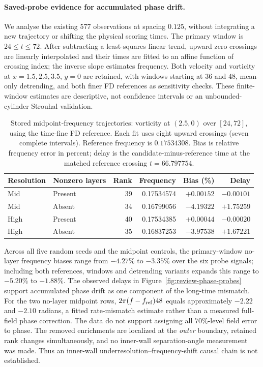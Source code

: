 \paragraph{Saved-probe evidence for accumulated phase drift.}
We analyse the existing 577 observations at spacing $0.125$, without integrating a new trajectory or shifting the physical scoring times. The primary window is $24\leq t\leq72$. After subtracting a least-squares linear trend, upward zero crossings are linearly interpolated and their times are fitted to an affine function of crossing index; the inverse slope estimates frequency. Both velocity and vorticity at $x=1.5,2.5,3.5$, $y=0$ are retained, with windows starting at 36 and 48, mean-only detrending, and both finer FD references as sensitivity checks. These finite-window estimates are descriptive, not confidence intervals or an unbounded-cylinder Strouhal validation.

\begin{table}[htbp]
\centering\small
\caption{Stored midpoint-frequency trajectories: vorticity at $(2.5,0)$ over $[24,72]$, using the time-fine FD reference. Each fit uses eight upward crossings (seven complete intervals). Reference frequency is $0.17534308$. Bias is relative frequency error in percent; delay is the candidate-minus-reference time at the matched reference crossing $t=66.797754$.}
\label{tab:review-phase-probes}
\begin{tabular}{llrrrr}
\toprule
Resolution & Nonzero layers & Rank & Frequency & Bias (\%) & Delay\\
\midrule
Mid & Present & 39 & 0.17534574 & $+0.00152$ & $-0.00101$\\
Mid & Absent & 34 & 0.16799056 & $-4.19322$ & $+1.75259$\\
High & Present & 40 & 0.17534385 & $+0.00044$ & $-0.00020$\\
High & Absent & 35 & 0.16837253 & $-3.97538$ & $+1.67221$\\
\bottomrule
\end{tabular}
\end{table}

Across all five random seeds and the midpoint controls, the primary-window no-layer frequency biases range from $-4.27\%$ to $-3.35\%$ over the six probe signals; including both references, windows and detrending variants expands this range to $-5.20\%$ to $-1.88\%$. The observed delays in Figure~\ref{fig:review-phase-probes} support accumulated phase drift as one component of the long-time mismatch. For the two no-layer midpoint rows, $2\pi(f-f_{\rm ref})48$ equals approximately $-2.22$ and $-2.10$ radians, a fitted rate-mismatch estimate rather than a measured full-field phase correction. The data do not support assigning all $70\%$-level field error to phase. The removed enrichments are localized at the \emph{outer} boundary, retained rank changes simultaneously, and no inner-wall separation-angle measurement was made. Thus an inner-wall underresolution--frequency-shift causal chain is not established.

